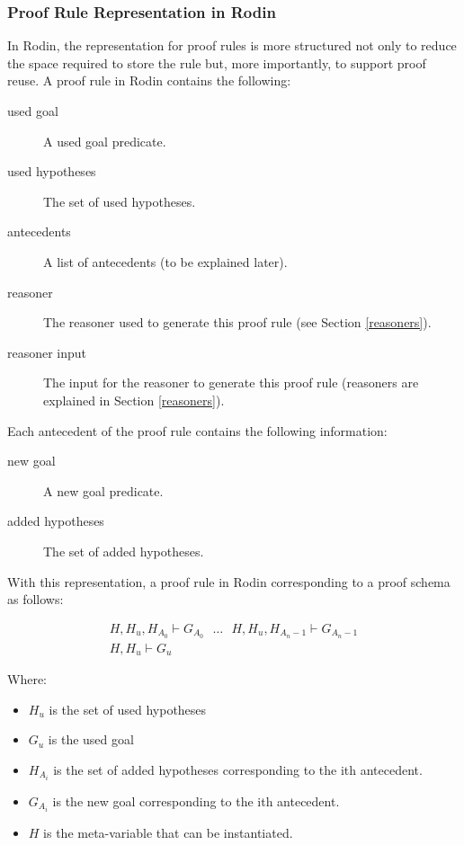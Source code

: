 
\subsubsection{Proof Rule Representation in Rodin}

In Rodin, the representation for proof rules is more structured not only to reduce the space required to store the rule but, more importantly, to support proof reuse.
A proof rule in Rodin contains the following:

\begin{description}
	\item[used goal] A used goal predicate. 
	\item[used hypotheses] The set of used hypotheses. 
	\item[antecedents] A list of antecedents (to be explained later). 
	\item[reasoner] The reasoner used to generate this proof rule (see Section \ref{reasoners}). 
	\item[reasoner input] The input for the reasoner to generate this proof rule (reasoners are explained in Section \ref{reasoners}). 
\end{description}

Each antecedent of the proof rule contains the following information:

\begin{description}
	\item[new goal] A new goal predicate. 
	\item[added hypotheses] The set of added hypotheses. 
\end{description}

With this representation, a proof rule in Rodin corresponding to a proof schema as follows: 

$$\begin{array}{c} H, H_u, H_{A_0} \vdash G_{A_0} ~~~\ldots~~~ H, H_u, H_{A_n-1} \vdash G_{A_n-1} \\ \hline H, H_u \vdash G_u \end{array} $$

Where:
\begin{itemize}
	\item     $H_u$ is the set of used hypotheses 
	\item     $G_u$ is the used goal 
	\item     $H_{A_i}$ is the set of added hypotheses corresponding to the ith antecedent. 
	\item     $G_{A_i}$ is the new goal corresponding to the ith antecedent. 
	\item     $H$ is the meta-variable that can be instantiated. 
\end{itemize}

